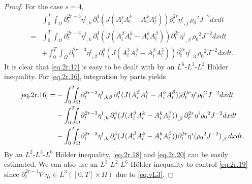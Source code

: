 \documentclass[12pt,twoside,reqno]{amsart}
\numberwithin{equation}{section}
\theoremstyle{definition}
\theoremstyle{remark}
\begin{document}
\begin{proof}
For the case $s=4$,
\begin{align}
  &{\int_0^T\!\!\!\!\int_\Omega } {\partial}_t^{2r-3}{{{\eta^l}}_{,{k}}\,}{\partial}_t^4(J(A_i^jA_l^k-A_i^kA_l^j)) {{{{\partial}_t^{2r}\eta^i}}_{,{j}}\,}{\rho_0}^2  J^{-2}dxdt\label{eq.2r.15}\\
  =&{\int_0^T\!\!\!\!\int_\Omega } {\partial}_t^{2r-3}{{{\eta^l}}_{,{k}}\,}{\partial}_t^4(J(A_i^\beta A_l^k-A_i^kA_l^\beta)) {{{{\partial}_t^{2r}\eta^i}}_{,{\beta}}\,}{\rho_0}^2  J^{-2}dxdt\label{eq.2r.16}\\
  &+{\int_0^T\!\!\!\!\int_\Omega } {\partial}_t^{2r-3}{{{\eta^l}}_{,{\beta}}\,}{\partial}_t^4(J(A_i^3A_l^\beta-A_i^\beta A_l^3)) {{{{\partial}_t^{2r}\eta^i}}_{,{3}}\,}{\rho_0}^2  J^{-2}dxdt.\label{eq.2r.17}
\end{align}
It is clear that \eqref{eq.2r.17} is easy to be dealt with by an $L^6$-$L^3$-$L^2$ H\"older inequality. For \eqref{eq.2r.16}, integration by parts yields
\begin{align}
  \eqref{eq.2r.16}=&-{\int_0^T\!\!\!\!\int_\Omega } {\partial}_t^{2r-3}{{{\eta^l}}_{,{k\beta}}\,}{\partial}_t^4(J(A_i^\beta A_l^k-A_i^kA_l^\beta)) {\partial}_t^{2r}\eta^i{\rho_0}^2  J^{-2}dxdt\label{eq.2r.18}\\
  &-{\int_0^T\!\!\!\!\int_\Omega } {\partial}_t^{2r-3}{{{\eta^l}}_{,{k}}\,}{\partial}_t^4{{{(J(A_i^\beta A_l^k-A_i^kA_l^\beta))}}_{,{\beta}}\,} {\partial}_t^{2r}\eta^i{\rho_0}^2  J^{-2}dxdt\label{eq.2r.19}\\
  &-{\int_0^T\!\!\!\!\int_\Omega } {\partial}_t^{2r-3}{{{\eta^l}}_{,{k}}\,}{\partial}_t^4(J(A_i^\beta A_l^k-A_i^kA_l^\beta)) {\partial}_t^{2r}\eta^i{{{({\rho_0}^2  J^{-2})}}_{,{\beta}}\,}dxdt.\label{eq.2r.20}
\end{align}
By an $L^2$-$L^3$-$L^6$ H\"older inequality, \eqref{eq.2r.18} and \eqref{eq.2r.20} can be easily estimated. We can also use an $L^3$-$L^2$-$L^6$ H\"older inequality to control \eqref{eq.2r.19} since ${\partial}_t^{2r-4}{\nabla}\eta_t\in L^3([0,T]\times\Omega)$ due to \eqref{eq.vL3}.


\end{proof}
\end{document}
